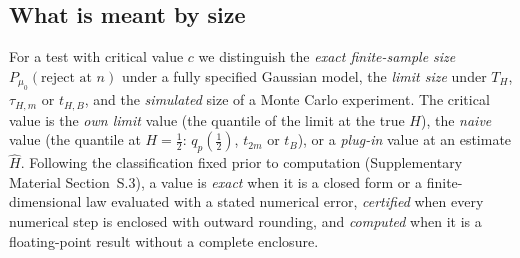 \subsection{What is meant by size}
For a test with critical value $c$ we distinguish the \emph{exact finite-sample size}
$P_{\mu_0}(\text{reject at }n)$ under a fully specified Gaussian model, the \emph{limit size} under $T_H$, $\tau_{H,m}$ or
$t_{H,B}$, and the \emph{simulated} size of a Monte Carlo experiment. The critical value is the \emph{own limit} value
(the quantile of the limit at the true $H$), the \emph{naive} value (the quantile at $H=\frac12$: $q_p(\frac12)$, $t_{2m}$
or $t_B$), or a \emph{plug-in} value at an estimate $\hat H$. Following the classification fixed prior to computation
(Supplementary Material Section~S.3), a value is \emph{exact} when it is a closed form or a finite-dimensional law
evaluated with a stated numerical error, \emph{certified} when every numerical step is enclosed with outward rounding,
and \emph{computed} when it is a floating-point result without a complete enclosure.
